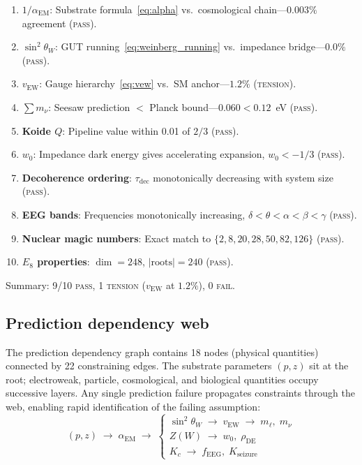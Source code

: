 \documentclass[aps,prd,twocolumn,superscriptaddress,longbibliography,nofootinbib]{revtex4-2}
\newcommand{\vEW}{v_{\mathrm{EW}}}
\newcommand{\sinW}{\sin^2\!\theta_W}
\newcommand{\alphaEM}{\alpha_{\mathrm{EM}}}
\newcommand{\Zimp}{Z}
\begin{document}
\begin{enumerate}
\item \textbf{$1/\alphaEM$}: Substrate formula~\eqref{eq:alpha}
  vs.\ cosmological chain---$0.003\%$ agreement (\textsc{pass}).

\item \textbf{$\sinW$}: GUT running~\eqref{eq:weinberg_running}
  vs.\ impedance bridge---$0.0\%$ (\textsc{pass}).

\item \textbf{$\vEW$}: Gauge hierarchy~\eqref{eq:vew} vs.\ SM
  anchor---$1.2\%$ (\textsc{tension}).

\item \textbf{$\sum m_\nu$}: Seesaw prediction $< $ Planck
  bound---$0.060 < 0.12$~eV (\textsc{pass}).

\item \textbf{Koide $Q$}: Pipeline value within 0.01 of $2/3$
  (\textsc{pass}).

\item \textbf{$w_0$}: Impedance dark energy gives accelerating
  expansion, $w_0 < -1/3$ (\textsc{pass}).

\item \textbf{Decoherence ordering}: $\tau_{\mathrm{dec}}$
  monotonically decreasing with system size (\textsc{pass}).

\item \textbf{EEG bands}: Frequencies monotonically increasing,
  $\delta < \theta < \alpha < \beta < \gamma$ (\textsc{pass}).

\item \textbf{Nuclear magic numbers}: Exact match to
  $\{2, 8, 20, 28, 50, 82, 126\}$ (\textsc{pass}).

\item \textbf{$E_8$ properties}: $\dim = 248$, $|\text{roots}| =
  240$ (\textsc{pass}).
\end{enumerate}

Summary: 9/10 \textsc{pass}, 1 \textsc{tension} ($\vEW$ at
$1.2\%$), 0 \textsc{fail}.

\subsection{Prediction dependency web}

The prediction dependency graph contains 18 nodes (physical
quantities) connected by 22 constraining edges.  The substrate
parameters $(p, z)$ sit at the root; electroweak, particle,
cosmological, and biological quantities occupy successive layers.
Any single prediction failure propagates constraints through the
web, enabling rapid identification of the failing assumption:
\begin{equation}
(p, z) \;\to\; \alphaEM \;\to\;
\begin{cases}
\sinW \;\to\; \vEW \;\to\; m_\ell,\; m_\nu \\
\Zimp(W) \;\to\; w_0,\; \rho_{\mathrm{DE}} \\
K_c \;\to\; f_{\mathrm{EEG}},\; K_{\mathrm{seizure}}
\end{cases}
\label{eq:dep_web}
\end{equation}
\end{document}
